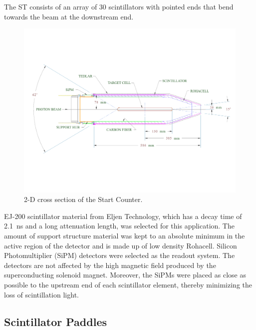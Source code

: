 The ST consists of an array of 30 scintillators with pointed ends that bend towards the beam at the downstream end. 
	\begin{figure}[!htb]
		\centering
		\includegraphics[width=1.0\columnwidth]{design/figs/st_2d_labels_fig_2.pdf}
		\caption{2-D cross section of the Start Counter.}
		\label{fig:st2dlabels}
	\end{figure}
EJ-200 scintillator material from Eljen Technology\cite{eljen}, which has a decay time of 2.1~ns and a long attenuation length\cite{ej200_specs}, was selected for this application.  The amount of support structure material was kept to an absolute minimum in the active region of the detector and is made up of low density Rohacell\cite{rohacell}. Silicon Photomultiplier (SiPM) detectors were selected as the readout system. The detectors are not affected by the high magnetic field produced by the superconducting solenoid magnet. Moreover, the SiPMs were placed as close as possible to the upstream end of each scintillator element, thereby minimizing the loss of scintillation light\cite{pooser16}.

\subsection{Scintillator Paddles} \label{sec:design_paddles}

